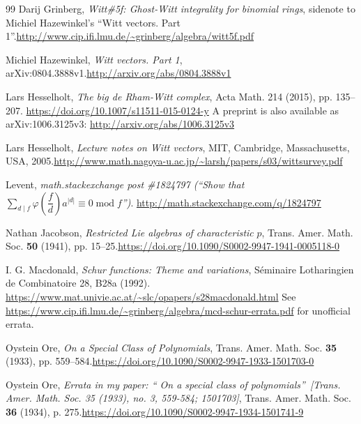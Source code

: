 \documentclass[numbers=enddot,12pt,final,onecolumn,notitlepage]{scrartcl}%
\theoremstyle{definition}
\let\sumnonlimits\sum
\renewcommand{\sum}{\sumnonlimits\limits}
\begin{document}
\begin{thebibliography}{99}
Darij Grinberg, \textit{Witt\#5f: Ghost-Witt integrality
for binomial rings}, sidenote to Michiel Hazewinkel's \textquotedblleft Witt
vectors. Part 1\textquotedblright.\newline\url{http://www.cip.ifi.lmu.de/~grinberg/algebra/witt5f.pdf}

Michiel Hazewinkel, \textit{Witt vectors. Part 1},
arXiv:0804.3888v1.\newline\url{http://arxiv.org/abs/0804.3888v1}

Lars Hesselholt, \textit{The big de Rham-Witt
complex}, Acta Math. 214 (2015), pp. 135--207.
\url{https://doi.org/10.1007/s11511-015-0124-y} \newline A preprint is also
available as arXiv:1006.3125v3: \url{http://arxiv.org/abs/1006.3125v3}

Lars Hesselholt, \textit{Lecture notes on Witt
vectors}, MIT, Cambridge, Massachusetts, USA, 2005.\newline\url{http://www.math.nagoya-u.ac.jp/~larsh/papers/s03/wittsurvey.pdf}

Levent, \textit{math.stackexchange post \#1824797
(\textquotedblleft Show that }$\sum_{d\mid f}\varphi\left(  \dfrac{f}%
{d}\right)  a^{\left\vert d\right\vert }\equiv0\operatorname{mod}%
f$\textit{\textquotedblright)}. \url{http://math.stackexchange.com/q/1824797}

Nathan Jacobson, \textit{Restricted Lie algebras of
characteristic }$p$, Trans. Amer. Math. Soc. \textbf{50} (1941), pp.
15--25.\newline\url{https://doi.org/10.1090/S0002-9947-1941-0005118-0}

I. G. Macdonald, \textit{Schur functions: Theme and
variations}, S\'{e}minaire Lotharingien de Combinatoire 28, B28a
(1992).\newline%
\url{https://www.mat.univie.ac.at/~slc/opapers/s28macdonald.html} \newline See
\url{https://www.cip.ifi.lmu.de/~grinberg/algebra/mcd-schur-errata.pdf} for
unofficial errata.

Oystein Ore, \textit{On a Special Class of Polynomials},
Trans. Amer. Math. Soc. \textbf{35} (1933), pp. 559--584.\newline\url{https://doi.org/10.1090/S0002-9947-1933-1501703-0}

Oystein Ore, \textit{Errata in my paper: \textquotedblleft
On a special class of polynomials\textquotedblright\ [Trans. Amer. Math. Soc.
35 (1933), no. 3, 559-584; 1501703]}, Trans. Amer. Math. Soc. \textbf{36}
(1934), p. 275.\newline\url{https://doi.org/10.1090/S0002-9947-1934-1501741-9}


\end{thebibliography}
\end{document}
